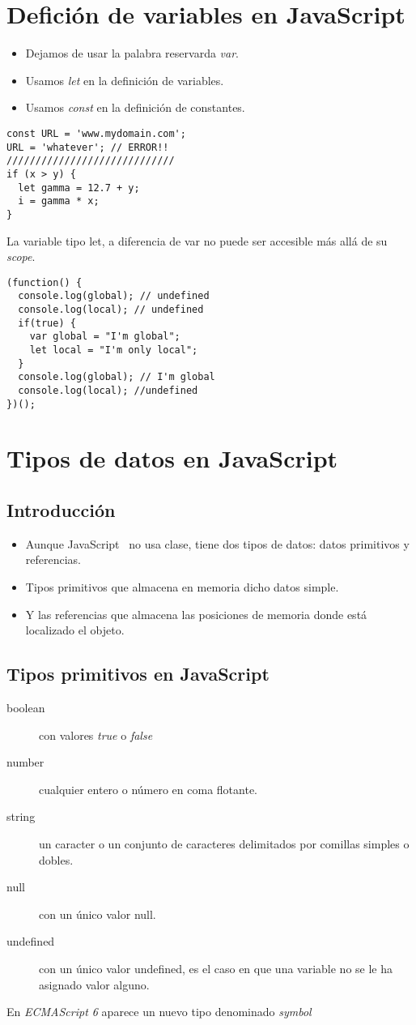 \documentclass[4paper]{article}
\newcommand{\J}{JavaScript}
\begin{document}
\section{Defición de variables en \J}
\begin{itemize}
\item Dejamos de usar la palabra reservarda \emph{var}.
\item Usamos \emph{let} en la definición de variables.
\item Usamos \emph{const} en la definición de constantes. 
\end{itemize}
\begin{lstlisting}
const URL = 'www.mydomain.com';
URL = 'whatever'; // ERROR!!
/////////////////////////////
if (x > y) {
  let gamma = 12.7 + y;
  i = gamma * x;
}
\end{lstlisting}
La variable tipo let, a diferencia de var no puede ser accesible más allá de su \emph{scope}.
\begin{lstlisting}
(function() {
  console.log(global); // undefined
  console.log(local); // undefined
  if(true) {
    var global = "I'm global";
    let local = "I'm only local";
  }
  console.log(global); // I'm global
  console.log(local); //undefined
})();
\end{lstlisting}
\section{Tipos de datos en \J}
\subsection{Introducción}
\begin{itemize}
\item Aunque \J ~ no usa clase, tiene dos tipos de datos: datos primitivos y referencias.
\item Tipos primitivos que almacena en memoria dicho datos simple.
\item Y las referencias que almacena las posiciones de memoria donde está localizado el objeto.
\end{itemize}

\subsection{Tipos primitivos en \J}
\begin{description}
\item[boolean] con valores \emph{true} o \emph{false}
\item[number] cualquier entero o número en coma flotante.
\item[string] un caracter o un conjunto de caracteres delimitados por comillas simples o dobles.
\item[null] con un único valor null.
\item[undefined] con un único valor undefined, es el caso en que una variable no se le  ha asignado valor alguno.
\end{description}
En \emph{ECMAScript 6} aparece un nuevo tipo denominado \emph{symbol}
\end{document}
